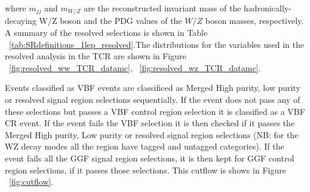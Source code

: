 where $m_{jj}$ and $m_{W/Z}$ are the reconstructed invariant mass of the hadronically-decaying W/Z boson and the PDG values of the $W/Z$ boson masses, respectively. A summary of the resolved selections is shown in Table ~\ref{tab:SRdefinitions_1lep_resolved}.The distributions for the variables used in the resolved analysis in the TCR are shown in Figure ~\ref{fig:resolved_ww_TCR_datamc}, ~\ref{fig:resolved_wz_TCR_datamc}.
 

Events classified as VBF events are classificed as Merged High purity, low purity or resolved signal region selections sequentially. If the event does not pass any of these selections but passes a VBF control region selection it is classified as a VBF CR event. 
If the event fails the VBF selection it is then checked if it passes the Merged High purity, Low purity or resolved signal region selections (NB: for the WZ decay modes all the region have tagged and untagged categories). If the event fails all the GGF signal region selections, it is then kept for GGF control region selections, if it passes those selections. This cutflow is shows in Figure ~\ref{fig:cutflow}. 


